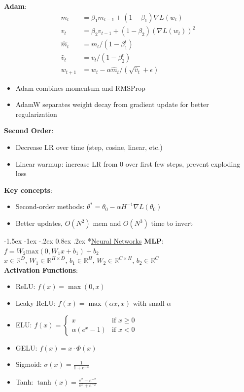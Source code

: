 \documentclass{article}
\makeatletter
\renewcommand\section{\@startsection{section}{1}{\z@}%
                                  {-1.5ex \@plus -1ex \@minus -.2ex}%
                                  {0.8ex \@plus.2ex}%
                                  {\normalfont\small\bfseries}}
\makeatother
\begin{document}
\begin{multicols}{3}
\textbf{Adam}:
\begin{align*}
m_t &= \beta_1 m_{t-1} + (1-\beta_1)\nabla L(w_t) \tag{momentum}\\
v_t &= \beta_2 v_{t-1} + (1-\beta_2)(\nabla L(w_t))^2 \tag{RMSProp}\\
\hat{m}_t &= m_t / (1-\beta_1^t) \tag{bias correction}\\
\hat{v}_t &= v_t / (1-\beta_2^t) \tag{bias correction}\\
w_{t+1} &= w_t - \alpha \hat{m}_t / (\sqrt{\hat{v}_t} + \epsilon)
\end{align*}
\begin{itemize}
    \item Adam combines momentum and RMSProp
    \item AdamW separates weight decay from gradient update for better regularization
\end{itemize}

\textbf{Second Order}:
\begin{itemize}
\item Decrease LR over time (step, cosine, linear, etc.)
\item Linear warmup: increase LR from 0 over first few steps, prevent exploding loss
\end{itemize}

\textbf{Key concepts}:
\begin{itemize}
\item Second-order methods: $\theta^* = \theta_0 - \alpha H^{-1} \nabla L(\theta_0)$
\item Better updates, $O(N^2)$ mem and $O(N^3)$ time to invert
\end{itemize}

\section*{\underline{Neural Networks}}
\textbf{MLP}: $f = W_2 \text{max}(0, W_1 x + b_1) + b_2$\\
$x \in \mathbb{R}^D$, $W_1 \in \mathbb{R}^{H \times D}$, $b_1 \in \mathbb{R}^H$, $W_2 \in \mathbb{R}^{C \times H}$, $b_2 \in \mathbb{R}^C$\\
\textbf{Activation Functions}:
\begin{itemize}
\item ReLU: $f(x) = \max(0, x)$
\item Leaky ReLU: $f(x) = \max(\alpha x, x)$ with small $\alpha$
\item ELU: $f(x) = \begin{cases} x & \text{if } x \geq 0 \\ \alpha(e^x - 1) & \text{if } x < 0 \end{cases}$
\item GELU: $f(x) = x \cdot \Phi(x)$
\item Sigmoid: $\sigma(x) = \frac{1}{1+e^{-x}}$
\item Tanh: $\tanh(x) = \frac{e^x - e^{-x}}{e^x + e^{-x}}$
\end{itemize}


\end{multicols}
\end{document}
